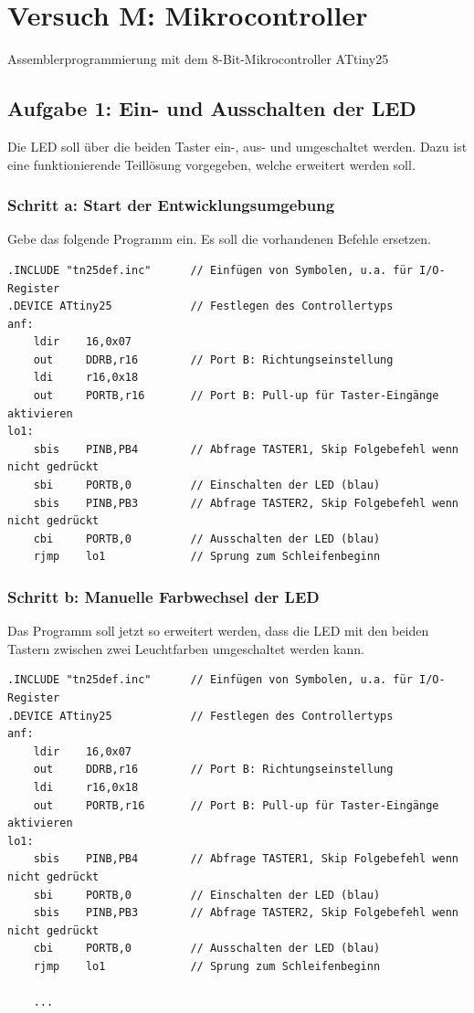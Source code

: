 \documentclass[a4paper,12pt,titlepage]{scrartcl}
\begin{document}
\newpage
\section*{Versuch M: Mikrocontroller}
Assemblerprogrammierung mit dem 8-Bit-Mikrocontroller ATtiny25

\subsection*{Aufgabe 1: Ein- und Ausschalten der LED}
Die LED soll über die beiden Taster ein-, aus- und umgeschaltet werden. Dazu ist eine funktionierende Teillösung vorgegeben, welche erweitert werden soll.

\subsubsection*{Schritt a: Start der Entwicklungsumgebung}
Gebe das folgende Programm ein. Es soll die vorhandenen Befehle ersetzen.
\begin{lstlisting}[basicstyle=\tiny]
.INCLUDE "tn25def.inc"      // Einfügen von Symbolen, u.a. für I/O-Register
.DEVICE ATtiny25            // Festlegen des Controllertyps
anf:
    ldir    16,0x07
    out     DDRB,r16        // Port B: Richtungseinstellung
    ldi     r16,0x18
    out     PORTB,r16       // Port B: Pull-up für Taster-Eingänge aktivieren
lo1:
    sbis    PINB,PB4        // Abfrage TASTER1, Skip Folgebefehl wenn nicht gedrückt
    sbi     PORTB,0         // Einschalten der LED (blau)
    sbis    PINB,PB3        // Abfrage TASTER2, Skip Folgebefehl wenn nicht gedrückt
    cbi     PORTB,0         // Ausschalten der LED (blau)
    rjmp    lo1             // Sprung zum Schleifenbeginn
\end{lstlisting}

\subsubsection*{Schritt b: Manuelle Farbwechsel der LED}
Das Programm soll jetzt so erweitert werden, dass die LED mit den beiden Tastern zwischen zwei Leuchtfarben umgeschaltet werden kann.
\begin{lstlisting}[basicstyle=\tiny]
.INCLUDE "tn25def.inc"      // Einfügen von Symbolen, u.a. für I/O-Register
.DEVICE ATtiny25            // Festlegen des Controllertyps
anf:
    ldir    16,0x07
    out     DDRB,r16        // Port B: Richtungseinstellung
    ldi     r16,0x18
    out     PORTB,r16       // Port B: Pull-up für Taster-Eingänge aktivieren
lo1:
    sbis    PINB,PB4        // Abfrage TASTER1, Skip Folgebefehl wenn nicht gedrückt
    sbi     PORTB,0         // Einschalten der LED (blau)
    sbis    PINB,PB3        // Abfrage TASTER2, Skip Folgebefehl wenn nicht gedrückt
    cbi     PORTB,0         // Ausschalten der LED (blau)
    rjmp    lo1             // Sprung zum Schleifenbeginn

    ...
\end{lstlisting}
\end{document}
